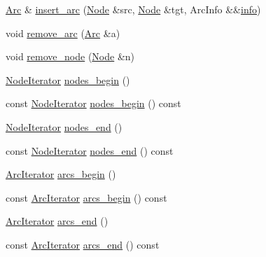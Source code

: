 \begin{DoxyCompactItemize}
\item 
\hyperlink{class_designar_1_1_graph_a74c730ef4ce2d20f998d72bd25c2b5bf}{Arc} \& \hyperlink{class_designar_1_1_graph_ab2182fa8a058595157b399b0828bb827}{insert\+\_\+arc} (\hyperlink{class_designar_1_1_graph_a5dfc7dba9d092ac489c72e40390c37d0}{Node} \&src, \hyperlink{class_designar_1_1_graph_a5dfc7dba9d092ac489c72e40390c37d0}{Node} \&tgt, Arc\+Info \&\&\hyperlink{class_designar_1_1_graph_a2a8b41ce641ad2fb1b84a4d6b024bb1a}{info})
\item 
void \hyperlink{class_designar_1_1_graph_a38205a764213c407acf25c936c645b5d}{remove\+\_\+arc} (\hyperlink{class_designar_1_1_graph_a74c730ef4ce2d20f998d72bd25c2b5bf}{Arc} \&a)
\item 
void \hyperlink{class_designar_1_1_graph_ad3dd48701d77a26ce86f43a50d8a3f28}{remove\+\_\+node} (\hyperlink{class_designar_1_1_graph_a5dfc7dba9d092ac489c72e40390c37d0}{Node} \&n)
\item 
\hyperlink{class_designar_1_1_graph_1_1_node_iterator}{Node\+Iterator} \hyperlink{class_designar_1_1_graph_a4f492f9b89d1d647e53171d7bb4d4acd}{nodes\+\_\+begin} ()
\item 
const \hyperlink{class_designar_1_1_graph_1_1_node_iterator}{Node\+Iterator} \hyperlink{class_designar_1_1_graph_acd4d942eba98e1eb138b9566f1d9bb75}{nodes\+\_\+begin} () const
\item 
\hyperlink{class_designar_1_1_graph_1_1_node_iterator}{Node\+Iterator} \hyperlink{class_designar_1_1_graph_a9f51b69f8827aabfe5b23f82e9bc5a4d}{nodes\+\_\+end} ()
\item 
const \hyperlink{class_designar_1_1_graph_1_1_node_iterator}{Node\+Iterator} \hyperlink{class_designar_1_1_graph_abb7e32a8a05850e788f4017677965b49}{nodes\+\_\+end} () const
\item 
\hyperlink{class_designar_1_1_graph_1_1_arc_iterator}{Arc\+Iterator} \hyperlink{class_designar_1_1_graph_a9448ba557a7b0ef90651d74d4a4ee36b}{arcs\+\_\+begin} ()
\item 
const \hyperlink{class_designar_1_1_graph_1_1_arc_iterator}{Arc\+Iterator} \hyperlink{class_designar_1_1_graph_a3906cae09045bb9c037e1c3c4e64dd97}{arcs\+\_\+begin} () const
\item 
\hyperlink{class_designar_1_1_graph_1_1_arc_iterator}{Arc\+Iterator} \hyperlink{class_designar_1_1_graph_a57a43c94f28df5958e912554d640bdaa}{arcs\+\_\+end} ()
\item 
const \hyperlink{class_designar_1_1_graph_1_1_arc_iterator}{Arc\+Iterator} \hyperlink{class_designar_1_1_graph_a81269c52d854ceb3d000f2642fcb52ae}{arcs\+\_\+end} () const

\end{DoxyCompactItemize}
